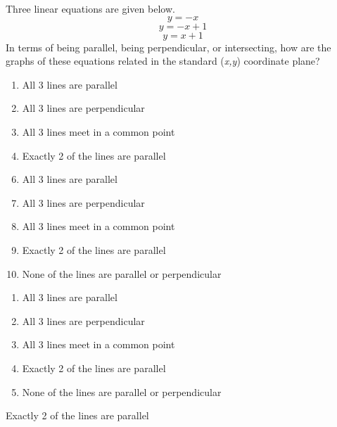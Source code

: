 Three linear equations are given below.\\
$$\textit{y}=-\textit{x}$$
$$\textit{y}=-\textit{x}+1$$
$$\textit{y}=\textit{x}+1$$
In terms of being parallel, being perpendicular, or intersecting, how are the graphs of these equations related in the standard (\textit{x,y}) coordinate plane?

\ifsat
	\begin{enumerate}[label=\Alph*)]
		\item   All 3 lines are parallel
		\item  All 3 lines are perpendicular
		\item  All 3 lines meet in a common point 
		\item  Exactly 2 of the lines are parallel %
	\end{enumerate}
\else
\fi

\ifacteven
	\begin{enumerate}[label=\textbf{\Alph*.},itemsep=\fill,align=left]
		\setcounter{enumii}{5}
		\item   All 3 lines are parallel
		\item  All 3 lines are perpendicular
		\item  All 3 lines meet in a common point
		\addtocounter{enumii}{1}
		\item  Exactly 2 of the lines are parallel %
		\item  None of the lines are parallel or perpendicular 
	\end{enumerate}
\else
\fi

\ifactodd
	\begin{enumerate}[label=\textbf{\Alph*.},itemsep=\fill,align=left]
		\item   All 3 lines are parallel
		\item  All 3 lines are perpendicular
		\item  All 3 lines meet in a common point 
		\item  Exactly 2 of the lines are parallel %
		\item  None of the lines are parallel or perpendicular 
	\end{enumerate}
\else
\fi

\ifgridin
  Exactly 2 of the lines are parallel %

\else
\fi

